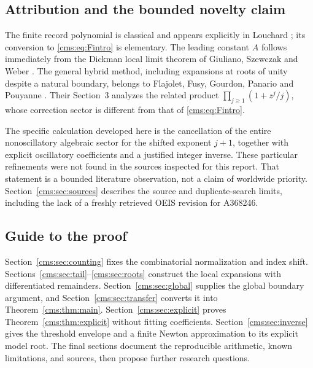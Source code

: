 \subsection{Attribution and the bounded novelty claim}
The finite record polynomial is classical and appears explicitly in Louchard \cite[Eq.~(1)]{Louchard}; its conversion to \eqref{cms:eq:Fintro} is elementary. The leading constant $A$ follows immediately from the Dickman local limit theorem of Giuliano, Szewczak and Weber \cite[Theorem~2.1]{GSW}. The general hybrid method, including expansions at roots of unity despite a natural boundary, belongs to Flajolet, Fusy, Gourdon, Panario and Pouyanne \cite{FFGPP}. Their Section~3 analyzes the related product $\prod_{j\geq1}(1+z^j/j)$, whose correction sector is different from that of \eqref{cms:eq:Fintro}.

The specific calculation developed here is the cancellation of the entire nonoscillatory algebraic sector for the shifted exponent $j+1$, together with explicit oscillatory coefficients and a justified integer inverse. These particular refinements were not found in the sources inspected for this report. That statement is a bounded literature observation, not a claim of worldwide priority. Section~\ref{cms:sec:sources} describes the source and duplicate-search limits, including the lack of a freshly retrieved OEIS revision for A368246.

\subsection{Guide to the proof}
Section~\ref{cms:sec:counting} fixes the combinatorial normalization and index shift. Sections~\ref{cms:sec:tail}--\ref{cms:sec:roots} construct the local expansions with differentiated remainders. Section~\ref{cms:sec:global} supplies the global boundary argument, and Section~\ref{cms:sec:transfer} converts it into Theorem~\ref{cms:thm:main}. Section~\ref{cms:sec:explicit} proves Theorem~\ref{cms:thm:explicit} without fitting coefficients. Section~\ref{cms:sec:inverse} gives the threshold envelope and a finite Newton approximation to its explicit model root. The final sections document the reproducible arithmetic, known limitations, and sources, then propose further research questions.

